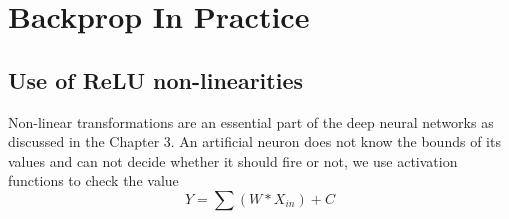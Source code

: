 \chapter{Backprop In Practice}\label{chp:Backprop in Practice}
\setlength{\abovedisplayskip}{7pt}
\setlength{\belowdisplayskip}{7pt}

\section{Use of ReLU non-linearities}
Non-linear transformations are an essential part of the deep neural networks as discussed in the Chapter 3. An artificial neuron does not know the bounds of its values and can not decide whether it should fire or not, we use activation functions to check the value 
\begin{equation}
    Y = \sum (W * X_{in}) + C
\end{equation}

